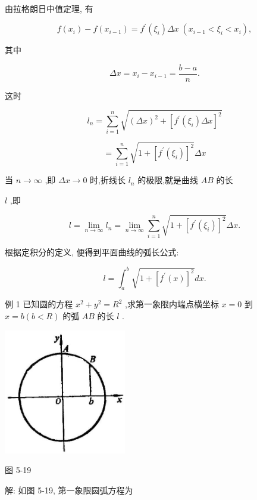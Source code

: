 \documentclass[lang=cn,newtx,10pt,scheme=chinese]{elegantbook}
\begin{document}
由拉格朗日中值定理, 有

\[
f\left( {x}_{i}\right) - f\left( {x}_{i - 1}\right) = {f}^{\prime }\left( {\xi }_{i}\right) {\Delta x}\;\left( {{x}_{i - 1} < {\xi }_{i} < {x}_{i}}\right) ,
\]

其中

\[
{\Delta x} = {x}_{i} - {x}_{i - 1} = \frac{b - a}{n}.
\]

这时

\[
{l}_{n} = \mathop{\sum }\limits_{{i = 1}}^{n}\sqrt{{\left( \Delta x\right) }^{2} + {\left\lbrack {f}^{\prime }\left( {\xi }_{i}\right) \Delta x\right\rbrack }^{2}}
\]

\[
= \mathop{\sum }\limits_{{i = 1}}^{n}\sqrt{1 + {\left\lbrack {f}^{\prime }\left( {\xi }_{i}\right) \right\rbrack }^{2}}{\Delta x}
\]

当 \(n \rightarrow \infty\) ,即 \({\Delta x} \rightarrow 0\) 时,折线长 \({l}_{n}\) 的极限,就是曲线 \({AB}\) 的长

\(l\) ,即

\[
l = \mathop{\lim }\limits_{{n \rightarrow \infty }}{l}_{n} = \mathop{\lim }\limits_{{n \rightarrow \infty }}\mathop{\sum }\limits_{{i = 1}}^{n}\sqrt{1 + {\left\lbrack {f}^{\prime }\left( {\xi }_{i}\right) \right\rbrack }^{2}}{\Delta x}.
\]

根据定积分的定义, 便得到平面曲线的弧长公式:

\[
l = {\int }_{a}^{b}\sqrt{1 + {\left\lbrack {f}^{\prime }\left( x\right) \right\rbrack }^{2}}{dx}.
\]

例 1 已知圆的方程 \({x}^{2} + {y}^{2} = {R}^{2}\) ,求第一象限内端点横坐标 \(x = 0\) 到 \(x = b\left( {b < R}\right)\) 的弧 \({AB}\) 的长 \(l\) .

\begin{center}
\includegraphics[max width=0.4\textwidth]{images/01912c18-5c3f-733d-b775-749ba9897a9d_242_691071.jpg}
\end{center}

图 5-19

解: 如图 5-19, 第一象限圆弧方程为
\end{document}
